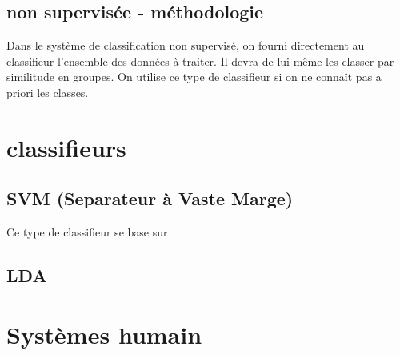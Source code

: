 		\subsection{non supervisée - méthodologie}

Dans le système de classification non supervisé, on fourni directement au classifieur l'ensemble des données à traiter. Il devra de lui-même les classer par similitude en groupes. On utilise ce type de classifieur si on ne connaît pas a priori les classes.

	\section{classifieurs}

		
		\subsection{SVM (Separateur à Vaste Marge)}

Ce type de classifieur se base sur 
		\subsection{LDA}

	\section{Systèmes humain}

